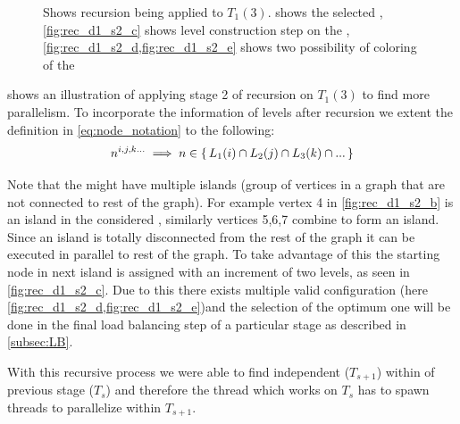 \begin{figure}[thbp]
     	\caption{Shows recursion being applied to $T_1(3)$.  shows the selected \subgraph, \cref{fig:rec_d1_s2_c} shows level construction step on the \subgraph, \cref{fig:rec_d1_s2_d,fig:rec_d1_s2_e} shows two possibility of \DONE coloring of the \subgraph}
     	
     	\label{fig:rec_d1_s2}
     \end{figure}
     
      shows an illustration of applying stage 2 of recursion on $T_1(3)$ to find more parallelism. To incorporate the information of levels after recursion we extent the definition in \cref{eq:node_notation} to the following:
	 \begin{equation}
	    n^{i,j,k...} \implies n \in \set{L_1(i) \cap L_2(j) \cap L_3(k) \cap ...} 
	 \end{equation}
     
     Note that the \subgraphs might have multiple islands (group of vertices in a graph that are not connected to rest of the graph). For example vertex 4 in \cref{fig:rec_d1_s2_b} is an island in the considered \subgraph, similarly vertices 5,6,7 combine to form an island. Since an island is totally disconnected from the rest of the graph it can be executed in parallel to rest of the graph. To take advantage of this the starting node in next island is assigned with an increment of two levels, as seen in \cref{fig:rec_d1_s2_c}. Due to this there exists multiple valid \DONE configuration (here \cref{fig:rec_d1_s2_d,fig:rec_d1_s2_e})and the selection of the optimum one will be done in the final load balancing step of a particular stage as described in \cref{subsec:LB}.    
     
     With this recursive process we were able to find independent \levelGroups ($T_{s+1}$) within \levelGroup of previous stage ($T_s$) and therefore the thread which works on $T_s$ has to spawn threads to parallelize within $T_{s+1}$.
     
